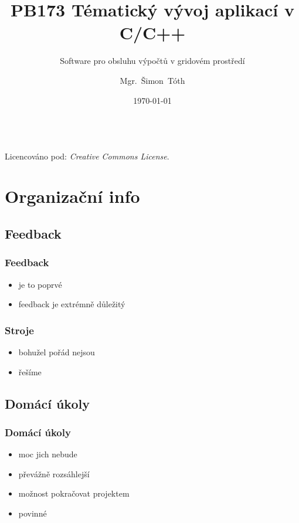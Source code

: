 

\title{PB173 Tématický vývoj aplikací v C/C++}
\subtitle{Software pro obsluhu výpočtů v gridovém prostředí}
\author[]{Mgr.~Šimon~Tóth}
\date{\today}

\newcommand{\CcNote}[1]{%
        Licencováno pod: \textit{Creative Commons #1 3.0 License}.%
}


	\begin{frame}
		\titlepage
		\vfill
		\begin{center}
			\\
			{\tiny\CcNote{\CcLongnameByNcSa}}
			\vspace*{2ex}
		\end{center}
	\end{frame}

\section{Organizační info}

\subsection{Feedback}

\begin{frame}
	\frametitle{Feedback}
	\begin{itemize}
		\item{je to poprvé}
		\item{feedback je extrémně důležitý}
	\end{itemize}
\end{frame}

\begin{frame}
	\frametitle{Stroje}
	\begin{itemize}
		\item{bohužel pořád nejsou}
		\item{řešíme}
	\end{itemize}
\end{frame}

\subsection{Domácí úkoly}

\begin{frame}
	\frametitle{Domácí úkoly}
	\begin{itemize}
		\item{moc jich nebude}
		\item{převážně rozsáhlejší}
		\item{možnost pokračovat projektem}
		\item{\alert{povinné}}
	\end{itemize}
\end{frame}

